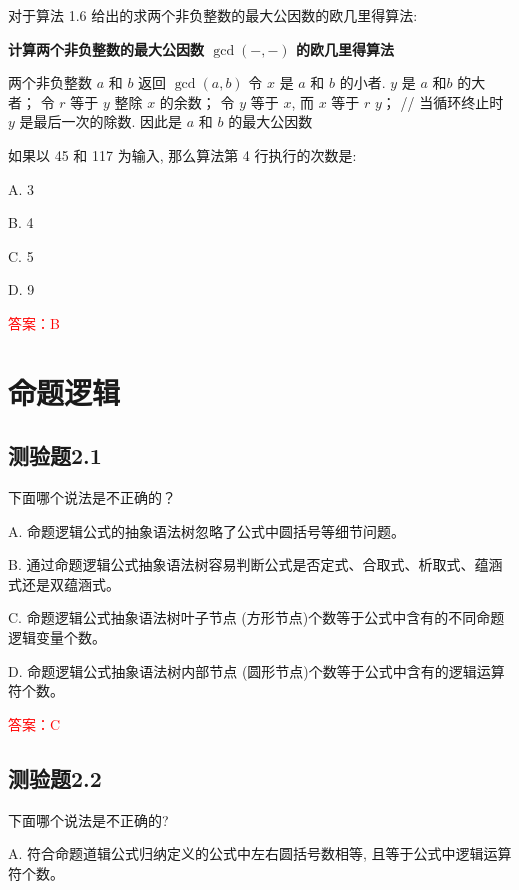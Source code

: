 \documentclass[UTF8, heading=true]{ctexart}
\begin{document}
对于算法 1.6 给出的求两个非负整数的最大公因数的欧几里得算法:

\begin{algorithm}
  \caption{\textbf{计算两个非负整数的最大公因数 $\operatorname{gcd}(-,-)$ 的欧几里得算法}}
  \begin{algorithmic}[1]
    \Require 两个非负整数 $a$ 和 $b$
    \Ensure 返回 $\operatorname{gcd}(a, b)$
    \State 令 $x$ 是 $a$ 和 $b$ 的小者. $y$ 是 $a$ 和$b$ 的大者；
    \State 令 $r$ 等于 $y$ 整除 $x$ 的余数；
    \State 令 $y$ 等于 $x$, 而 $x$ 等于 $r$
    \EndWhile
    \State \Return $y$； // 当循环终止时 $y$ 是最后一次的除数. 因此是 $a$ 和 $b$ 的最大公因数
  \end{algorithmic}
\end{algorithm}

如果以 45 和 117 为输入, 那么算法第 4 行执行的次数是: $\qquad$

A. 3

B. 4

C. 5

D. 9

\textcolor{red}{答案：B}

\clearpage

\section{命题逻辑}

\subsection{测验题2.1}

下面哪个说法是不正确的？

A. 命题逻辑公式的抽象语法树忽略了公式中圆括号等细节问题。

B. 通过命题逻辑公式抽象语法树容易判断公式是否定式、合取式、析取式、蕴涵式还是双蕴涵式。

C. 命题逻辑公式抽象语法树叶子节点 (方形节点)个数等于公式中含有的不同命题逻辑变量个数。

D. 命题逻辑公式抽象语法树内部节点 (圆形节点)个数等于公式中含有的逻辑运算符个数。

\textcolor{red}{答案：C}

\subsection{测验题2.2}

下面哪个说法是不正确的?

A. 符合命题道辑公式归纳定义的公式中左右圆括号数相等, 且等于公式中逻辑运算符个数。
\end{document}
